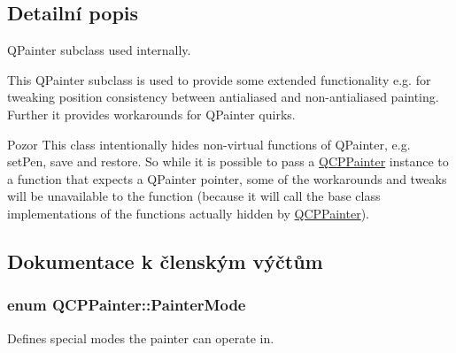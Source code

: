 \subsection{Detailní popis}
Q\+Painter subclass used internally. 

This Q\+Painter subclass is used to provide some extended functionality e.\+g. for tweaking position consistency between antialiased and non-\/antialiased painting. Further it provides workarounds for Q\+Painter quirks.

\begin{DoxyWarning}{Pozor}
This class intentionally hides non-\/virtual functions of Q\+Painter, e.\+g. set\+Pen, save and restore. So while it is possible to pass a \hyperlink{classQCPPainter}{Q\+C\+P\+Painter} instance to a function that expects a Q\+Painter pointer, some of the workarounds and tweaks will be unavailable to the function (because it will call the base class implementations of the functions actually hidden by \hyperlink{classQCPPainter}{Q\+C\+P\+Painter}). 
\end{DoxyWarning}


\subsection{Dokumentace k členským výčtům}
\hypertarget{classQCPPainter_a156cf16444ff5e0d81a73c615fdb156d}{}
\subsubsection[{Painter\+Mode}]{\setlength{\rightskip}{0pt plus 5cm}enum {\bf Q\+C\+P\+Painter\+::\+Painter\+Mode}}\label{classQCPPainter_a156cf16444ff5e0d81a73c615fdb156d}


Defines special modes the painter can operate in. 

